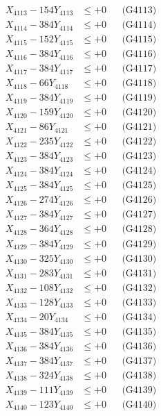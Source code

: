 \documentclass[a4paper,10pt]{article}
\begin{document}
{\begin{align}
X_{4113} - 154Y_{4113} &\leq +0 && \text{(G4113)} \\
X_{4114} - 384Y_{4114} &\leq +0 && \text{(G4114)} \\
X_{4115} - 152Y_{4115} &\leq +0 && \text{(G4115)} \\
X_{4116} - 384Y_{4116} &\leq +0 && \text{(G4116)} \\
X_{4117} - 384Y_{4117} &\leq +0 && \text{(G4117)} \\
X_{4118} - 66Y_{4118} &\leq +0 && \text{(G4118)} \\
X_{4119} - 384Y_{4119} &\leq +0 && \text{(G4119)} \\
X_{4120} - 159Y_{4120} &\leq +0 && \text{(G4120)} \\
\allowbreak
X_{4121} - 86Y_{4121} &\leq +0 && \text{(G4121)} \\
X_{4122} - 235Y_{4122} &\leq +0 && \text{(G4122)} \\
X_{4123} - 384Y_{4123} &\leq +0 && \text{(G4123)} \\
X_{4124} - 384Y_{4124} &\leq +0 && \text{(G4124)} \\
X_{4125} - 384Y_{4125} &\leq +0 && \text{(G4125)} \\
X_{4126} - 274Y_{4126} &\leq +0 && \text{(G4126)} \\
X_{4127} - 384Y_{4127} &\leq +0 && \text{(G4127)} \\
X_{4128} - 364Y_{4128} &\leq +0 && \text{(G4128)} \\
X_{4129} - 384Y_{4129} &\leq +0 && \text{(G4129)} \\
X_{4130} - 325Y_{4130} &\leq +0 && \text{(G4130)} \\
\allowbreak
X_{4131} - 283Y_{4131} &\leq +0 && \text{(G4131)} \\
X_{4132} - 108Y_{4132} &\leq +0 && \text{(G4132)} \\
X_{4133} - 128Y_{4133} &\leq +0 && \text{(G4133)} \\
X_{4134} - 20Y_{4134} &\leq +0 && \text{(G4134)} \\
X_{4135} - 384Y_{4135} &\leq +0 && \text{(G4135)} \\
X_{4136} - 384Y_{4136} &\leq +0 && \text{(G4136)} \\
X_{4137} - 384Y_{4137} &\leq +0 && \text{(G4137)} \\
X_{4138} - 324Y_{4138} &\leq +0 && \text{(G4138)} \\
X_{4139} - 111Y_{4139} &\leq +0 && \text{(G4139)} \\
X_{4140} - 123Y_{4140} &\leq +0 && \text{(G4140)} \\

\end{align}}
\end{document}

